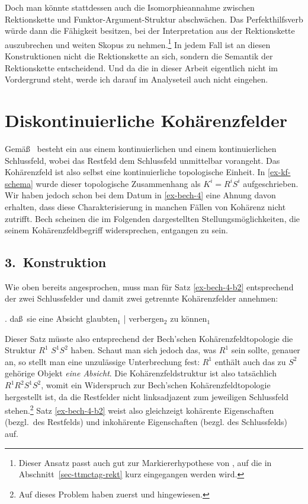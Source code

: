 Doch man könnte stattdessen auch die Isomorphieannahme zwischen Rektionskette und Funktor-Argument-Struktur abschwächen. Das Perfekthilfsverb würde dann die Fähigkeit besitzen, bei der Interpretation aus der Rektionskette auszubrechen und weiten Skopus zu nehmen.\footnote{Dieser Ansatz passt auch gut zur Markiererhypothese von \citet[Section~8.2]{Meurers:99}, auf die in Abschnitt~\ref{sec-ttmctag-rekt} kurz eingegangen werden wird.} In jedem Fall ist an diesen Konstruktionen nicht die Rektionskette an sich, sondern die Semantik der Rektionskette entscheidend. Und da die in dieser Arbeit eigentlich nicht im Vordergrund steht, werde ich darauf im Analyseteil auch nicht eingehen.  

\section{Diskontinuierliche Kohärenzfelder} \label{sec-permutation-kohaerenzfeld}

Gemä\ss\ \cite{Bech:55} besteht ein  aus einem kontinuierlichen  und einem kontinuierlichen Schlussfeld, wobei das Restfeld dem Schlussfeld unmittelbar vorangeht.  Das Kohärenzfeld ist also selbst eine kontinuierliche topologische Einheit. In \ref{ex-kf-schema} wurde dieser topologische Zusammenhang als $K^i = R^i S^i$ aufgeschrieben.  Wir haben jedoch schon bei dem Datum in \ref{ex-bech-4} eine Ahnung davon erhalten, dass diese Charakterisierung in manchen Fällen von Kohärenz nicht zutrifft. Bech scheinen die im Folgenden dargestellten Stellungsmöglichkeiten, die seinem Kohärenzfeldbegriff widersprechen, entgangen zu sein. 

\subsection{3.~Konstruktion}

Wie oben bereits angesprochen, muss man für Satz \ref{ex-bech-4-b2} entsprechend der  zwei Schlussfelder und damit zwei getrennte Kohärenzfelder annehmen: 

\ex. da\ss\ sie eine Absicht glaubten$_1$ | verbergen$_2$ zu können$_1$ \label{ex-bech-4-b2}

Dieser Satz müsste also entsprechend der Bech'schen Kohärenzfeldtopologie die Struktur $R^1$ $S^1 S^2$ haben. Schaut man sich jedoch das, was $R^1$ sein sollte, genauer an, so stellt man eine unzulässige Unterbrechung fest: $R^1$ enthält auch das zu $S^2$ gehörige Objekt {\it eine Absicht}. Die Kohärenzfeldstruktur ist also tatsächlich $R^1 R^2 S^1 S^2$, womit ein Widerspruch zur Bech'schen Kohärenzfeldtopologie hergestellt ist, da die Restfelder nicht linksadjazent zum jeweiligen Schlussfeld stehen.\footnote{Auf dieses Problem haben zuerst \cite{Kvam:79} und \citet[331, Fußnote 4]{Hoehle:86} hingewiesen.} Satz \ref{ex-bech-4-b2} weist also gleichzeigt kohärente Eigenschaften (bezgl.\ des Restfelds) und inkohärente Eigenschaften (bezgl. des Schlussfelds) auf.  

